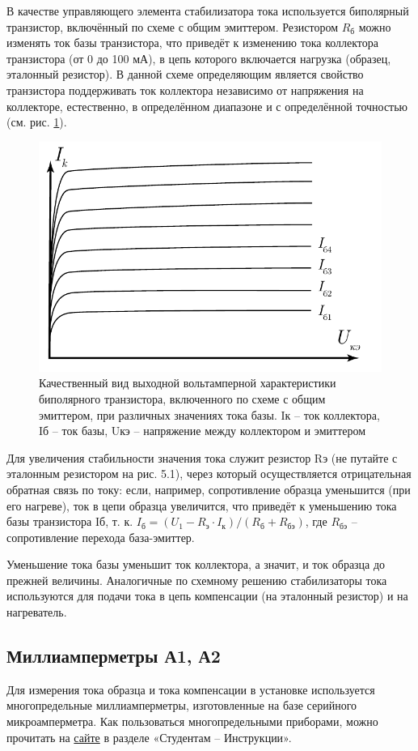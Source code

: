 В качестве управляющего элемента стабилизатора тока используется биполярный транзистор, включённый по схеме с общим
эмиттером. Резистором $R_\text{б}$ можно изменять ток базы транзистора, что приведёт к изменению тока коллектора
транзистора (от 0 до 100 мА), в цепь которого включается нагрузка (образец, эталонный резистор). В данной схеме
определяющим является свойство транзистора поддерживать ток коллектора независимо от напряжения на коллекторе,
естественно, в определённом диапазоне и с определённой точностью (см. рис. \ref{fig:6.4}).
\begin{figure}[h!]
	\centering
	\includegraphics[width = .5\linewidth]{img/61}
	\caption{Качественный вид выходной вольтамперной характеристики биполярного транзистора, включенного по схеме с
	общим эмиттером, при различных значениях тока базы. Iк – ток коллектора, Iб – ток базы, Uкэ – напряжение между коллектором и эмиттером}
	\label{fig:6.4}
\end{figure}
 Для увеличения стабильности значения тока служит резистор Rэ (не путайте с эталонным резистором на рис. 5.1), через
 который осуществляется отрицательная обратная связь по току: если, например, сопротивление образца уменьшится (при его
 нагреве), ток в цепи образца увеличится, что приведёт к уменьшению тока базы транзистора Iб, т. к.
$I_\text{б} = (U_1 - R_\text{э} \cdot I_\text{к}) / (R_\text{б} + R_\text{бэ})$, где $R_\text{бэ}$ – сопротивление перехода база-эмиттер.

Уменьшение тока базы уменьшит ток коллектора, а значит, и ток образца до прежней величины.
Аналогичные по схемному решению стабилизаторы тока используются для подачи тока в цепь компенсации (на эталонный
резистор) и на нагреватель.

\subsection{Миллиамперметры А1, А2}
Для измерения тока образца и тока компенсации в установке используется многопредельные миллиамперметры, изготовленные на
базе серийного микроамперметра. Как пользоваться многопредельными приборами, можно прочитать на
\href{http://www.rf.unn.ru/eledep/}{сайте} в разделе «Студентам – Инструкции».

